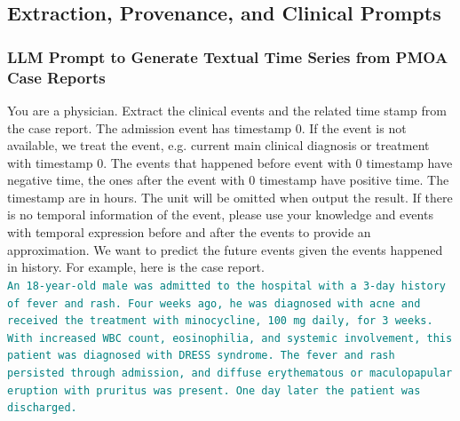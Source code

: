 \subsection{Extraction, Provenance, and Clinical Prompts}
\label{ch05:apd:llm-prompts}

\ChFiveHeadingOnly
\subsubsection{LLM Prompt to Generate Textual Time Series from PMOA Case Reports}
\label{ch05:apd:extraction-prompt}

\begin{tcolorbox}[
  colback=gray!5,
  colframe=gray!100,
  title=Prompt,
  boxrule=2pt,
  enhanced,
  breakable,                %
  before skip=8pt,          %
  after skip=8pt,           %
  pad at break*=2mm,        %
  fontupper=\scriptsize,
  title after break={Prompt} %
]
You are a physician. Extract the clinical events and the related time stamp from the case report. The admission event has timestamp 0. If the event is not available, we treat the event, e.g. current main clinical diagnosis or treatment with timestamp 0. The events that happened before event with 0 timestamp have negative time, the ones after the event with 0 timestamp have positive time. The timestamp are in hours. The unit will be omitted when output the result. If there is no temporal information of the event, please use your knowledge and events with temporal expression before and after the events to provide an approximation. We want to predict the future events given the events happened in history. For example, here is the case report.\\

\textcolor{teal}{\texttt{An 18-year-old male was admitted to the hospital with a 3-day history of fever and rash. Four weeks ago, he was diagnosed with acne and received the treatment with minocycline, 100 mg daily, for 3 weeks. With increased WBC count, eosinophilia, and systemic involvement, this patient was diagnosed with DRESS syndrome. The fever and rash persisted through admission, and diffuse erythematous or maculopapular eruption with pruritus was present. One day later the patient was discharged.}}\\


\end{tcolorbox}
